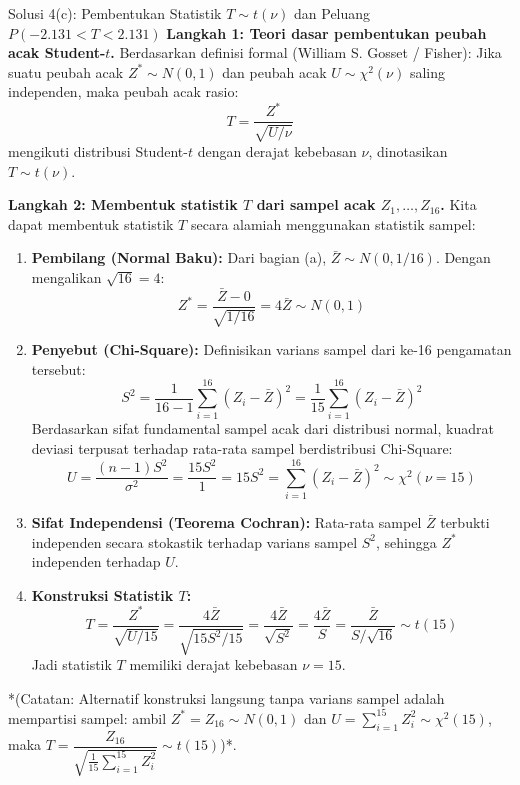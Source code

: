 \documentclass[10pt,twoside]{article}
\begin{document}
\begin{solbox}{Solusi 4(c): Pembentukan Statistik $T \sim t(\nu)$ dan Peluang $P(-2.131 < T < 2.131)$}
\textbf{Langkah 1: Teori dasar pembentukan peubah acak Student-$t$.}
Berdasarkan definisi formal (William S. Gosset / Fisher):
Jika suatu peubah acak $Z^* \sim N(0, 1)$ dan peubah acak $U \sim \chi^2(\nu)$ saling independen, maka peubah acak rasio:
\[
T = \frac{Z^*}{\sqrt{U / \nu}}
\]
mengikuti distribusi Student-$t$ dengan derajat kebebasan $\nu$, dinotasikan $T \sim t(\nu)$.

\textbf{Langkah 2: Membentuk statistik $T$ dari sampel acak $Z_1, \dots, Z_{16}$.}
Kita dapat membentuk statistik $T$ secara alamiah menggunakan statistik sampel:
\begin{enumerate}[label=\arabic*.]
  \item \textbf{Pembilang (Normal Baku):}
  Dari bagian (a), $\bar{Z} \sim N(0, 1/16)$. Dengan mengalikan $\sqrt{16} = 4$:
  \[
  Z^* = \frac{\bar{Z} - 0}{\sqrt{1/16}} = 4\bar{Z} \sim N(0, 1)
  \]
  \item \textbf{Penyebut (Chi-Square):}
  Definisikan varians sampel dari ke-16 pengamatan tersebut:
  \[
  S^2 = \frac{1}{16 - 1} \sum_{i=1}^{16} (Z_i - \bar{Z})^2 = \frac{1}{15} \sum_{i=1}^{16} (Z_i - \bar{Z})^2
  \]
  Berdasarkan sifat fundamental sampel acak dari distribusi normal, kuadrat deviasi terpusat terhadap rata-rata sampel berdistribusi Chi-Square:
  \[
  U = \frac{(n - 1)S^2}{\sigma^2} = \frac{15 S^2}{1} = 15 S^2 = \sum_{i=1}^{16} (Z_i - \bar{Z})^2 \sim \chi^2(\nu = 15)
  \]
  \item \textbf{Sifat Independensi (Teorema Cochran):}
  Rata-rata sampel $\bar{Z}$ terbukti independen secara stokastik terhadap varians sampel $S^2$, sehingga $Z^*$ independen terhadap $U$.
  \item \textbf{Konstruksi Statistik $T$:}
  \[
  T = \frac{Z^*}{\sqrt{U / 15}} = \frac{4\bar{Z}}{\sqrt{15 S^2 / 15}} = \frac{4\bar{Z}}{\sqrt{S^2}} = \frac{4\bar{Z}}{S} = \frac{\bar{Z}}{S / \sqrt{16}} \sim t(15)
  \]
  Jadi statistik $T$ memiliki derajat kebebasan $\nu = 15$.
\end{enumerate}
*(Catatan: Alternatif konstruksi langsung tanpa varians sampel adalah mempartisi sampel: ambil $Z^* = Z_{16} \sim N(0, 1)$ dan $U = \sum_{i=1}^{15} Z_i^2 \sim \chi^2(15)$, maka $T = \dfrac{Z_{16}}{\sqrt{\frac{1}{15}\sum_{i=1}^{15} Z_i^2}} \sim t(15)$)*.


\end{solbox}
\end{document}
